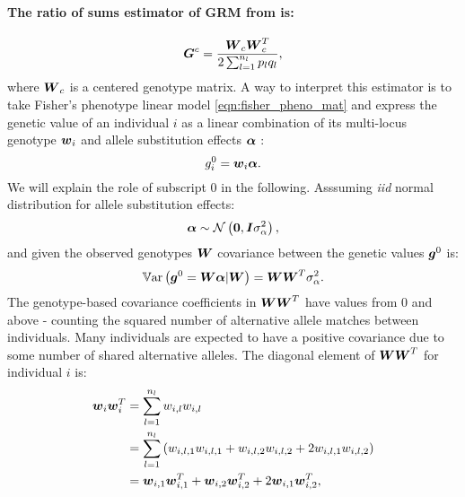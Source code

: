 \paragraph{The ratio of sums estimator of GRM from \cite{vanraden2008efficient} is:}
%
\begin{equation} \label{eqn:G_c}
  \boldsymbol{G}^{c} = \frac{\boldsymbol{W}_c\boldsymbol{W}_c^T}{2\sum_{l=1}^{n_l} p_l q_l},
\end{equation}
%
where $\boldsymbol{W}_c$ is a centered genotype matrix.
%
A way to interpret this estimator is to take Fisher's phenotype
linear model \eqref{eqn:fisher_pheno_mat} and express the genetic value
of an individual $i$ as a linear combination of its multi-locus genotype
$\boldsymbol{w}_i$ and allele substitution effects $\boldsymbol{\alpha}$
\citep{fisher1919correlation, falconer1996introduction}:
%
\begin{equation} \label{eqn:g_walpha}
  g_i^0 = \boldsymbol{w}_i\boldsymbol{\alpha}.
\end{equation}
%
We will explain the role of subscript $0$ in the following.
%
Asssuming \textit{iid} normal distribution for allele substitution effects:
%
\begin{equation} \label{eqn:alpha_normal}
  \boldsymbol{\alpha} \sim \mathcal{N}\left(\boldsymbol{0}, \boldsymbol{I}\sigma_{\alpha}^2\right),
\end{equation}
%
and given the observed genotypes $\boldsymbol{W}$ covariance between the
genetic values $\boldsymbol{g}^0$ is:
%
\begin{equation} \label{eqn:WWT0}
  \mathbb{V}\text{ar}\left(\boldsymbol{g}^0=\boldsymbol{W}\boldsymbol{\alpha} | \boldsymbol{W}\right) = \boldsymbol{W}\boldsymbol{W}^T\sigma_{\alpha}^2.
\end{equation}
%
The genotype-based covariance coefficients in $\boldsymbol{W}\boldsymbol{W}^T$ have
values from $0$ and above - counting the squared number of alternative
allele matches between individuals.
%
Many individuals are expected to have a positive covariance due to some
number of shared alternative alleles.
%
The diagonal element of $\boldsymbol{W}\boldsymbol{W}^T$ for individual $i$ is:
%
\begin{align} \label{eqn:WWT0_ind}
  \boldsymbol{w}_i\boldsymbol{w}_i^T & = \sum_{l=1}^{n_l} w_{i,l} w_{i,l} \notag \\
                           & = \sum_{l=1}^{n_l} \left(w_{i,l,1} w_{i,l,1} + w_{i,l,2} w_{i,l,2} + 2w_{i,l,1} w_{i,l,2}\right) \notag \\ 
                           & = \boldsymbol{w}_{i,1}\boldsymbol{w}_{i,1}^T + \boldsymbol{w}_{i,2}\boldsymbol{w}_{i,2}^T + 2\boldsymbol{w}_{i,1}\boldsymbol{w}_{i,2}^T, 
\end{align}
